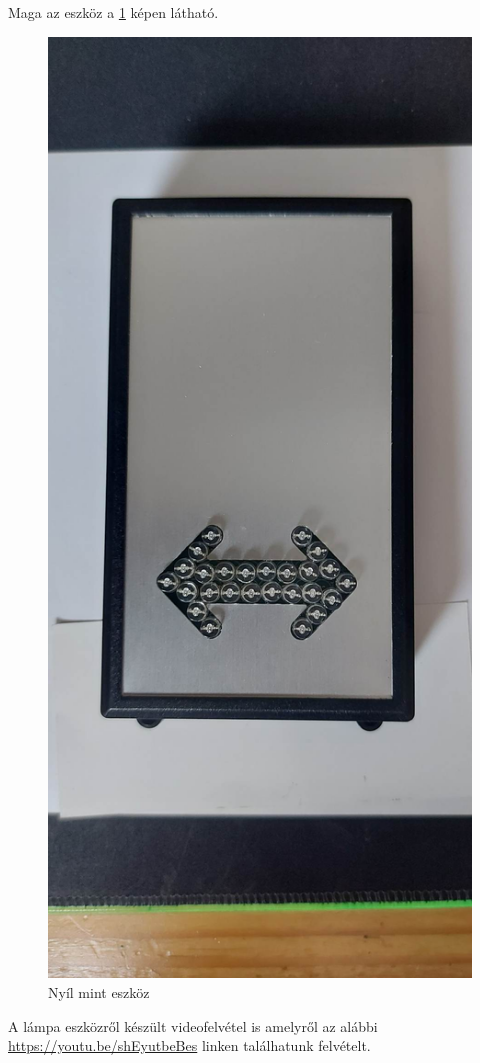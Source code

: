 \documentclass[tocnopagenum]{thesis-ekf}
\theoremstyle{definition}
\theoremstyle{remark}
\begin{document}
	Maga az eszköz a \ref{fig:nyil01} képen látható.	\begin{figure}[H]	
		\centering
		\includegraphics[scale=0.12]{nyil01}
		\caption[Nyíl eszköz]{Nyíl mint eszköz}
		\label{fig:nyil01}
	\end{figure}
A lámpa eszközről készült videofelvétel is amelyről az alábbi \url{https://youtu.be/shEyutbeBes} linken találhatunk felvételt.
\newpage
\end{document}
